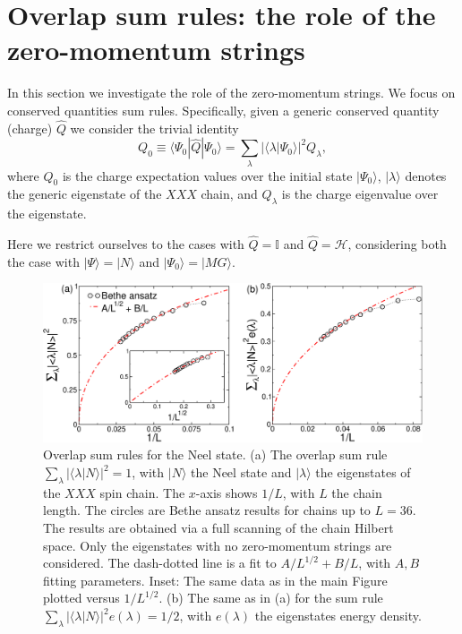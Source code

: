 \documentclass[11pt]{iopart}
\begin{document}
\section{Overlap sum rules: the role of the zero-momentum strings}
\label{ov-sum-rules}

In this section we investigate the role of the zero-momentum strings. We focus on 
conserved quantities sum rules. Specifically, given a generic conserved quantity 
(charge) $\hat Q$ we consider the trivial identity  
%
\begin{equation}
\label{sum}
Q_0\equiv\langle\Psi_0|\hat Q|\Psi_0\rangle=\sum\limits_{\lambda}|\langle\lambda|
\Psi_0\rangle|^2Q_\lambda, 
\end{equation}
%
where $Q_0$ is the charge expectation values over the initial state $|\Psi_0
\rangle$, $|\lambda\rangle$ denotes the generic eigenstate of the $XXX$ chain, 
and $Q_\lambda$ is the charge eigenvalue over the eigenstate. 

Here we restrict ourselves to the cases with $\hat Q=\mathbb{I}$ and $\hat 
Q={\mathcal H}$, considering both the case with $|\Psi\rangle=|N\rangle$ and 
$|\Psi_0\rangle=|MG\rangle$. 




\begin{figure}[t]
\begin{center}
\includegraphics[width=.9\textwidth]{./draft_figs/Neel}
\end{center}
\caption{ Overlap sum rules for the Neel state. (a) The overlap sum rule 
 $\sum_{\lambda}|\langle\lambda|N\rangle|^2=1$, with $|N\rangle$ 
 the Neel state and $|\lambda\rangle$ the eigenstates  of the $XXX$ 
 spin chain. The $x$-axis shows $1/L$, with $L$ the chain length. The 
 circles are Bethe ansatz results for chains up to $L=36$. The results 
 are obtained via a full scanning of the chain Hilbert space. Only the 
 eigenstates with no zero-momentum strings are considered. The dash-dotted 
 line is a fit to $A/L^{1/2}+B/L$, with $A,B$ fitting parameters. Inset: 
 The same data as in the main Figure plotted versus $1/L^{1/2}$. (b) 
 The same as in (a) for the sum rule $\sum_{\lambda}|\langle
 \lambda|N\rangle|^2e(\lambda)=1/2$, with $e(\lambda)$  the 
 eigenstates energy density. 
}
\label{fig2-neel-sr}
\end{figure}
\end{document}
